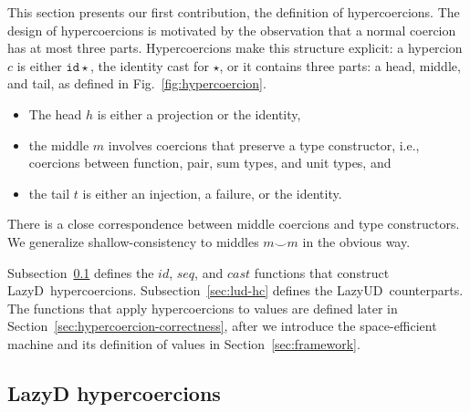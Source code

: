 \documentclass[acmsmall,review,anonymous]{acmart}\settopmatter{printfolios=true,printccs=false,printacmref=false}
\newcommand{\figref}[1]{Fig.~\ref{#1}}
\newcommand{\lazyUD}{Lazy\;UD}
\newcommand{\lazyD}{Lazy\;D}
\newcommand{\TOOdyn}[0]{\star}
\newcommand{\hyperCoercionI}[0]{\mathtt{id\star}}
\begin{document}
This section presents our first contribution, the definition of
hypercoercions.  The design of hypercoercions is motivated by the
observation that a normal coercion has at most three
parts. Hypercoercions make this structure explicit: a hypercion $c$ is
either $\hyperCoercionI$, the identity cast for $\TOOdyn$, or it contains
three parts: a head, middle, and tail, as defined in
\figref{fig:hypercoercion}.
\begin{itemize}
\item The head $h$ is either a projection or the identity,
\item the middle $m$ involves coercions that preserve a type
  constructor, i.e., coercions between function, pair, sum types, and
  unit types, and
\item the tail $t$ is either an injection, a failure, or the identity.
\end{itemize}
There is a close correspondence between middle coercions and type
constructors.  We generalize shallow-consistency to middles $m \smile
m$ in the obvious way.

Subsection~\ref{sec:ld-hc} defines the $id$, $seq$, and $cast$
functions that construct
\lazyD\ hypercoercions. Subsection~\ref{sec:lud-hc} defines the
\lazyUD\ counterparts.  The functions that apply hypercoercions to
values are defined later in
Section~\ref{sec:hypercoercion-correctness}, after we introduce the
space-efficient machine and its definition of values in
Section~\ref{sec:framework}.

\subsection{\lazyD{} hypercoercions}
\label{sec:ld-hc}
\end{document}
